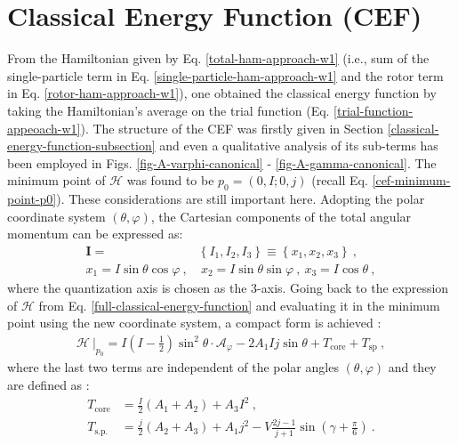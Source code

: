\section{Classical Energy Function (CEF)}

From the Hamiltonian given by Eq. \ref{total-ham-approach-w1} (i.e., sum of the single-particle term in Eq. \ref{single-particle-ham-approach-w1} and the rotor term in Eq. \ref{rotor-ham-approach-w1}), one obtained the classical energy function by taking the Hamiltonian's average on the trial function (Eq. \ref{trial-function-appeoach-w1}). The structure of the CEF was firstly given in Section \ref{classical-energy-function-subsection} and even a qualitative analysis of its sub-terms has been employed in Figs. \ref{fig-A-varphi-canonical} - \ref{fig-A-gamma-canonical}. The minimum point of $\mathcal{H}$ was found to be $p_0=(0,I;0,j)$ (recall Eq. \ref{cef-minimum-point-p0}). These considerations are still important here. Adopting the polar coordinate system $(\theta,\varphi)$, the Cartesian components of the total angular momentum can be expressed as:
\begin{align}
    \mathbf{I}=&\left\{I_1,I_2,I_3\right\}\equiv\left\{x_1,x_2,x_3\right\}\ ,\nonumber\\
    x_1=I\sin\theta\cos\varphi\ ,&\ x_2=I\sin\theta\sin\varphi\ ,\ x_3=I\cos\theta\ ,
    \label{polar-coordinates-total-AM}
\end{align}
where the quantization axis is chosen as the $3$-axis. Going back to the expression of $\mathcal{H}$ from Eq. \ref{full-classical-energy-function} and evaluating it in the minimum point using the new coordinate system, a compact form is achieved \cite{poenaru2021extensive2}:
\begin{align}
    \left. \mathcal{H}\ \right\vert_{p_0}=I\left(I-\frac{1}{2}\right)\sin^2\theta\cdot \mathcal{A}_\varphi-2A_1Ij\sin\theta+T_\text{core}+T_\text{sp}\ ,
    \label{CEF-minimum-point-Tcore-Tsp}
\end{align}
where the last two terms are independent of the polar angles $(\theta,\varphi)$ and they are defined as \cite{poenaru2021extensive2}:
\begin{align}
    T_\text{core}&=\frac{I}{2}(A_1+A_2)+A_3I^2\ ,\nonumber\\
    T_\text{s.p.}&=\frac{j}{2}(A_2+A_3)+A_1j^2-V\frac{2j-1}{j+1}\sin\left(\gamma+\frac{\pi}{6}\right)\ .
    \label{core-sp-sub-terms}
\end{align}

